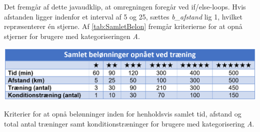\noindent
Det fremgår af dette javaudklip, at omregningen foregår ved if/else-loops. Hvis afstanden ligger indenfor et interval af 5 og 25, sættes \textit{b\_afstand} lig 1, hvilket repræsenterer én stjerne. Af \autoref{tab:SamletBelon} fremgår kriterierne for at opnå stjerner for brugere med kategoriseringen \textit{A}.  

\begin{table}[H]
\centering
\includegraphics[width=1\textwidth]{figures/imple/SamletBelon}
\caption{Kriterier for at opnå belønninger inden for henholdsvis samlet tid, afstand og total antal træninger samt konditionstræninger for brugere med kategorisering \textit{A}.}
\label{tab:SamletBelon}
\end{table}  
